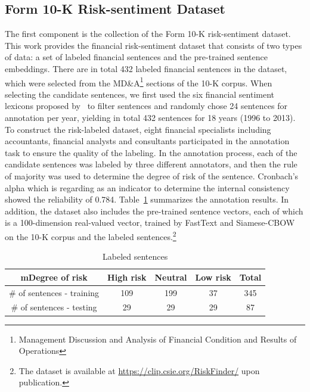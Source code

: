 \documentclass[10pt,conference,letterpaper]{IEEEtran}
\begin{document}
\subsection{Form 10-K Risk-sentiment Dataset}
    The first component is the collection of the Form 10-K risk-sentiment dataset. This work provides the financial risk-sentiment dataset that consists of two types of data: a set of labeled financial sentences and the pre-trained sentence embeddings. There are in total 432 labeled financial sentences in the dataset, which were selected from the MD\&A\footnote{Management Discussion and Analysis of Financial Condition and Results of Operations} sections of the 10-K corpus. When selecting the candidate sentences, we first used the six financial sentiment lexicons proposed by~\cite{loughran2011liability} to filter sentences and randomly chose 24 sentences for annotation per year, yielding in total 432 sentences for 18 years (1996 to 2013). To construct the risk-labeled dataset, eight financial specialists including accountants, financial analysts and consultants participated in the annotation task to ensure the quality of the labeling. In the annotation process, each of the candidate sentences was labeled by three different annotators, and then the rule of majority was used to determine the degree of risk of the sentence. Cronbach's alpha which is regarding as an indicator to determine the internal consistency showed the reliability of 0.784. Table~\ref{tab:labelsummary} summarizes the annotation results.  In addition, the dataset also includes the pre-trained sentence vectors, each of which is a 100-dimension real-valued vector, trained by FastText and Siamese-CBOW on the 10-K corpus and the labeled sentences.\footnote{The dataset is available at \url{https://clip.csie.org/RiskFinder/} upon publication.}

\begin{table}[ht]
\centering
    \caption{Labeled sentences}
    \label{tab:labelsummary}
    \begin{tabular}{|c|c|c|c|c|}
        \hline
        mDegree of risk & High risk & Neutral & Low risk & Total\\
        \hline
        \# of sentences - training & 109 & 199 & 37 & 345\\
        \hline
        \# of sentences - testing & 29 & 29 & 29 & 87\\
        \hline
    \end{tabular}
\end{table}
\end{document}

